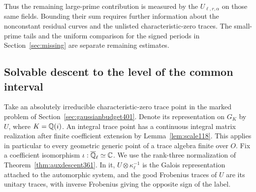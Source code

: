 \documentclass[a4paper,11pt]{article}
\theoremstyle{definition}
\theoremstyle{remark}
\numberwithin{equation}{section}
\begin{document}
Thus the remaining large-prime contribution is measured by the
\(U_{\ell,r,\alpha}\) on those same fields. Bounding their sum
requires further information about the nonconstant residual
curves and the unlisted characteristic-zero traces. The
small-prime tails and the uniform comparison for the signed
periods in Section~\ref{sec:missing} are separate remaining
estimates.


\subsection{Solvable descent to the level of the common interval}
\label{sec:gaussiansolvable402}

Take an absolutely irreducible characteristic-zero trace point in
the marked problem of Section~\ref{sec:gaussianbudget401}. Denote
its representation on \(G_K\) by \(U\), where \(K=\mathbb Q(i)\).
An integral trace point has a continuous integral matrix
realization after finite coefficient extension by
Lemma~\ref{lem:scale118}. This applies in particular to every
geometric generic point of a trace algebra finite over \(O\).
Fix a coefficient isomorphism \(\iota:\overline{\mathbb Q}_\ell\simeq\mathbb C\).
We use the rank-three normalization of
Theorem~\ref{thm:auxdescent361}. In it, \(U\otimes\kappa_\ell^{-1}\)
is the Galois representation attached to the automorphic system,
and the good Frobenius traces of \(U\) are its unitary traces,
with inverse Frobenius giving the opposite sign of the label.
\end{document}
